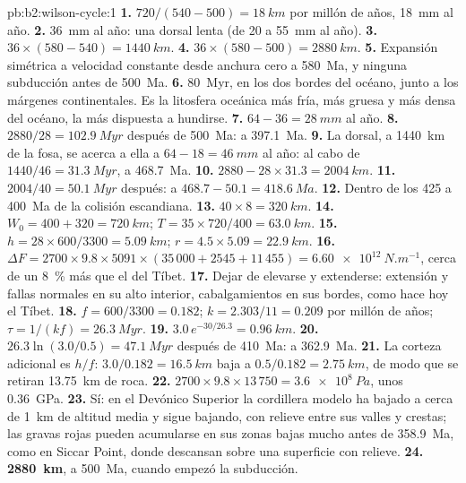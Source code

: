 \begin{solution}{pb:b2:wilson-cycle:1}
\textbf{1.} $720/(540 - 500) = \qty{18}{km}$ por millón de años, \qty{18}{mm} al año.
\textbf{2.} \qty{36}{mm} al año: una dorsal lenta (de 20 a \qty{55}{mm} al año).
\textbf{3.} $36\times(580 - 540) = \qty{1440}{km}$.
\textbf{4.} $36\times(580 - 500) = \qty{2880}{km}$.
\textbf{5.} Expansión simétrica a velocidad constante desde anchura cero a \qty{580}{Ma}, y ninguna
subducción antes de \qty{500}{Ma}.
\textbf{6.} \qty{80}{Myr}, en los dos bordes del océano, junto a los márgenes continentales. Es la
litosfera oceánica más fría, más gruesa y más densa del océano, la más dispuesta a hundirse.
\textbf{7.} $64 - 36 = \qty{28}{mm}$ al año.
\textbf{8.} $2880/28 = \qty{102.9}{Myr}$ después de \qty{500}{Ma}: a \qty{397.1}{Ma}.
\textbf{9.} La dorsal, a \qty{1440}{km} de la fosa, se acerca a ella a $64 - 18 =
\qty{46}{mm}$ al año: al cabo de $1440/46 = \qty{31.3}{Myr}$, a \qty{468.7}{Ma}.
\textbf{10.} $2880 - 28\times31.3 = \qty{2004}{km}$.
\textbf{11.} $2004/40 = \qty{50.1}{Myr}$ después: a $468.7 - 50.1 = \qty{418.6}{Ma}$.
\textbf{12.} Dentro de los 425 a \qty{400}{Ma} de la colisión escandiana.
\textbf{13.} $40\times8 = \qty{320}{km}$.
\textbf{14.} $W_0 = 400 + 320 = \qty{720}{km}$; $T = 35\times720/400 = \qty{63.0}{km}$.
\textbf{15.} $h = 28\times600/3300 = \qty{5.09}{km}$; $r = 4.5\times5.09 = \qty{22.9}{km}$.
\textbf{16.} $\Delta F = 2700\times9.8\times5091\times(35\,000 + 2545 + 11\,455) =
\qty{6.60e12}{N.m^{-1}}$, cerca de un \qty{8}{\percent} más que el del Tíbet.
\textbf{17.} Dejar de elevarse y extenderse: extensión y fallas normales en su alto interior,
cabalgamientos en sus bordes, como hace hoy el Tíbet.
\textbf{18.} $f = 600/3300 = 0.182$; $k = 2.303/11 = 0.209$ por millón de años; $\tau = 1/(kf)
= \qty{26.3}{Myr}$.
\textbf{19.} $3.0\,e^{-30/26.3} = \qty{0.96}{km}$.
\textbf{20.} $26.3\ln(3.0/0.5) = \qty{47.1}{Myr}$ después de \qty{410}{Ma}: a \qty{362.9}{Ma}.
\textbf{21.} La corteza adicional es $h/f$: $3.0/0.182 = \qty{16.5}{km}$ baja a $0.5/0.182 =
\qty{2.75}{km}$, de modo que se retiran \qty{13.75}{km} de roca.
\textbf{22.} $2700\times9.8\times13\,750 = \qty{3.6e8}{Pa}$, unos \qty{0.36}{GPa}.
\textbf{23.} Sí: en el Devónico Superior la cordillera modelo ha bajado a cerca de \qty{1}{km} de altitud
media y sigue bajando, con relieve entre sus valles y crestas; las gravas rojas pueden
acumularse en sus zonas bajas mucho antes de \qty{358.9}{Ma}, como en Siccar Point, donde descansan sobre una superficie
con relieve.
\textbf{24.} \textbf{\qty[text-series-to-math=true]{2880}{km}}, a \qty{500}{Ma}, cuando
empezó la subducción.
\end{solution}
